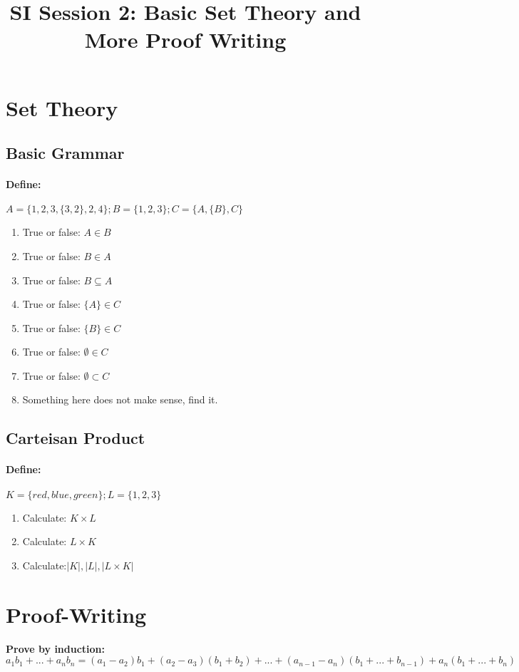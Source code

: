 \documentclass[12pt]{article}
\date{}
\author{}
\title{SI Session 2: Basic Set Theory and More Proof Writing}
\begin{document}
	\maketitle

\section{Set Theory}
	\subsection{Basic Grammar}
	\paragraph{Define: } $A =\{1,2,3,\{3,2\},2,4\};   B=\{1,2,3\}; C=\{A,\{B\},C\}$
	\begin{enumerate}
	\item True or false: $A \in B$
	\item True or false: $B \in A$
	\item True or false: $B \subseteq A$
	\item True or false: $\{A\}\in C$
	\item True or false: $\{B\} \in C$
	\item True or false: $\emptyset \in C$
	\item True or false: $\emptyset \subset C$
	\item Something here does not make sense, find it.
	\end{enumerate} 
	\subsection{Carteisan Product}
	\paragraph{Define: } $K=\{red, blue, green\}; L=\{1,2,3\}$
	\begin{enumerate}[resume] 
	\item Calculate: $K \times L$
	\item Calculate: $L \times K$
	\item Calculate:$ |K|, |L|, |L\times K|$
	\end{enumerate}
\section{Proof-Writing}
	\textbf{Prove by induction: } \\ \small $a_1 b_1+...+a_n b_n=(a_1-a_2)b_1+(a_2-a_3)(b_1+b_2)+...+(a_{n-1} - a_n)(b_1+...+b_{n-1})+a_n(b_1+...+b_n)$
\end{document}
